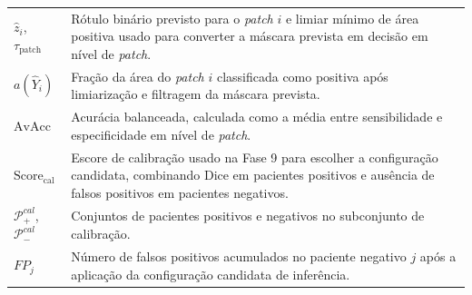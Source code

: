 \begin{longtable}{p{3.0cm}p{12.0cm}}
    $\hat{z}_i$, $\tau_{\mathrm{patch}}$ &
  Rótulo binário previsto para o \textit{patch} $i$ e limiar mínimo de área
  positiva usado para converter a máscara prevista em decisão em nível de
  \textit{patch}.\\

  $a(\hat{Y}_i)$ &
  Fração da área do \textit{patch} $i$ classificada como positiva após
  limiarização e filtragem da máscara prevista.\\

  $\mathrm{AvAcc}$ &
  Acurácia balanceada, calculada como a média entre sensibilidade e
  especificidade em nível de \textit{patch}.\\

  $\mathrm{Score}_{\mathrm{cal}}$ &
  Escore de calibração usado na Fase 9 para escolher a configuração candidata,
  combinando Dice em pacientes positivos e ausência de falsos positivos em
  pacientes negativos.\\

  $\mathcal{P}_+^{cal}$, $\mathcal{P}_-^{cal}$ &
  Conjuntos de pacientes positivos e negativos no subconjunto de calibração.\\

  $FP_j$ &
  Número de falsos positivos acumulados no paciente negativo $j$ após a aplicação
  da configuração candidata de inferência.\\

\end{longtable}
\endgroup